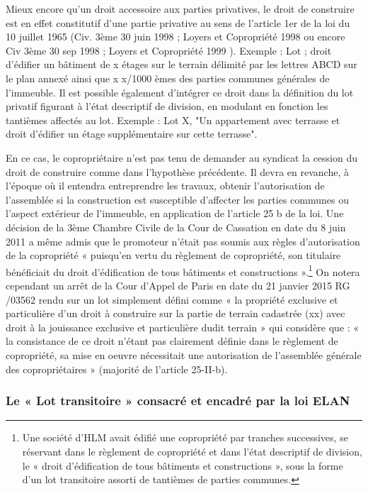 			Mieux encore qu’un droit accessoire aux parties privatives, le droit de construire est en effet constitutif
			d’une partie privative au sens de l’article 1er de la loi du 10 juillet 1965 (Civ. 3ème 30 juin 1998 ; Loyers et
			Copropriété 1998  ou encore Civ 3ème 30 sep 1998 ; Loyers et Copropriété 1999 ).
			Exemple : Lot  ; droit d'édifier un bâtiment de x étages sur le terrain délimité par les lettres ABCD
			sur le plan annexé ainsi que x x/1000 èmes des parties communes générales de l'immeuble.
			Il est possible également d’intégrer ce droit dans la définition du lot privatif figurant à l’état descriptif de
			division, en modulant en fonction les tantièmes affectés au lot.
			Exemple : Lot \no X, "Un appartement avec terrasse et droit d'édifier un étage supplémentaire sur
			cette terrasse".
		
			En ce cas, le copropriétaire n’est pas tenu de demander au syndicat la cession du droit de construire
			comme dans l’hypothèse précédente. Il devra en revanche, à l’époque où il entendra entreprendre les
			travaux, obtenir l’autorisation de l’assemblée si la construction est susceptible d’affecter les parties
			communes ou l’aspect extérieur de l’immeuble, en application de l’article 25 b de la loi.
			Une décision de la 3ème Chambre Civile de la Cour de Cassation en date du 8 juin 2011 a même admis que
			le promoteur n’était pas soumis aux règles d’autorisation de la copropriété « puisqu’en vertu du règlement
			de copropriété, son titulaire bénéficiait du droit d’édification de tous bâtiments et constructions ».\footnote{
			Une société d’HLM avait édifié une copropriété par tranches successives, se réservant dans le règlement de copropriété et dans	l’état descriptif de division, le « droit d’édification de tous bâtiments et constructions », sous la forme d’un lot transitoire assorti	de tantièmes de parties communes.
			}
			On notera cependant un arrêt de la Cour d’Appel de Paris en date du 21 janvier 2015 RG /03562
			rendu sur un lot simplement défini comme « la propriété exclusive et particulière d'un droit à construire
			sur la partie de terrain cadastrée (xx) avec droit à la jouissance exclusive et particulière dudit terrain » qui
			considère que : « la consistance de ce droit n'étant pas clairement définie dans le règlement de
			copropriété, sa mise en oeuvre nécessitait une autorisation de l'assemblée générale des copropriétaires »
			(majorité de l’article 25-II-b).
		
		\subsubsection{Le « Lot transitoire » consacré et encadré par la loi ELAN}
		
